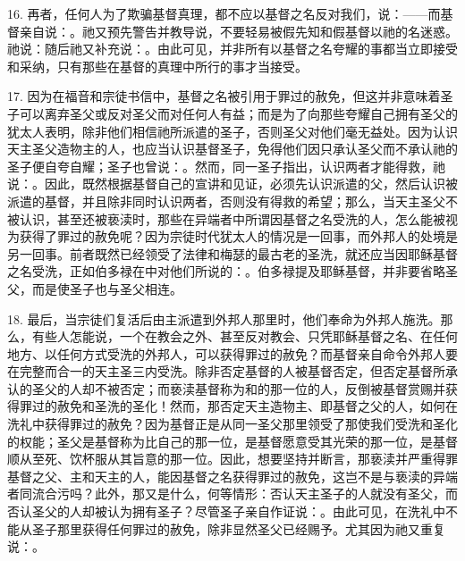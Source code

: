 16. 再者，任何人为了欺骗基督真理，都不应以基督之名反对我们，说：——而基督亲自说：。祂又预先警告并教导说，不要轻易被假先知和假基督以祂的名迷惑。祂说：随后祂又补充说：。由此可见，并非所有以基督之名夸耀的事都当立即接受和采纳，只有那些在基督的真理中所行的事才当接受。\par

17. 因为在福音和宗徒书信中，基督之名被引用于罪过的赦免，但这并非意味着圣子可以离弃圣父或反对圣父而对任何人有益；而是为了向那些夸耀自己拥有圣父的犹太人表明，除非他们相信祂所派遣的圣子，否则圣父对他们毫无益处。因为认识天主圣父造物主的人，也应当认识基督圣子，免得他们因只承认圣父而不承认祂的圣子便自夸自耀；圣子也曾说：。然而，同一圣子指出，认识两者才能得救，祂说：。因此，既然根据基督自己的宣讲和见证，必须先认识派遣的父，然后认识被派遣的基督，并且除非同时认识两者，否则没有得救的希望；那么，当天主圣父不被认识，甚至还被亵渎时，那些在异端者中所谓因基督之名受洗的人，怎么能被视为获得了罪过的赦免呢？因为宗徒时代犹太人的情况是一回事，而外邦人的处境是另一回事。前者既然已经领受了法律和梅瑟的最古老的圣洗，就还应当因耶稣基督之名受洗，正如伯多禄在中对他们所说的：。伯多禄提及耶稣基督，并非要省略圣父，而是使圣子也与圣父相连。\par

18. 最后，当宗徒们复活后由主派遣到外邦人那里时，他们奉命为外邦人施洗。那么，有些人怎能说，一个在教会之外、甚至反对教会、只凭耶稣基督之名、在任何地方、以任何方式受洗的外邦人，可以获得罪过的赦免？而基督亲自命令外邦人要在完整而合一的天主圣三内受洗。除非否定基督的人被基督否定，但否定基督所承认的圣父的人却不被否定；而亵渎基督称为和的那一位的人，反倒被基督赏赐并获得罪过的赦免和圣洗的圣化！然而，那否定天主造物主、即基督之父的人，如何在洗礼中获得罪过的赦免？因为基督正是从同一圣父那里领受了那使我们受洗和圣化的权能；圣父是基督称为比自己的那一位，是基督愿意受其光荣的那一位，是基督顺从至死、饮杯服从其旨意的那一位。因此，想要坚持并断言，那亵渎并严重得罪基督之父、主和天主的人，能因基督之名获得罪过的赦免，这岂不是与亵渎的异端者同流合污吗？此外，那又是什么，何等情形：否认天主圣子的人就没有圣父，而否认圣父的人却被认为拥有圣子？尽管圣子亲自作证说：。由此可见，在洗礼中不能从圣子那里获得任何罪过的赦免，除非显然圣父已经赐予。尤其因为祂又重复说：。\par

